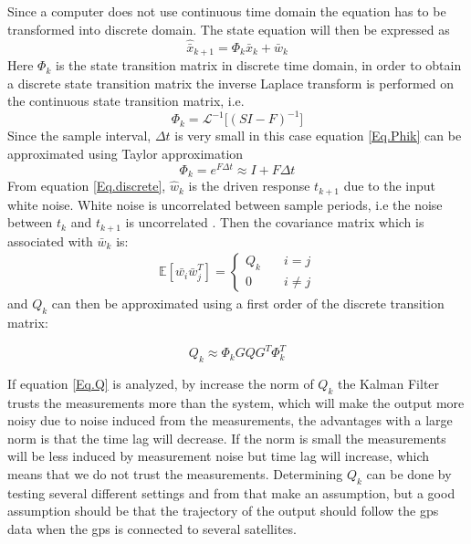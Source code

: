 Since a computer does not use continuous time domain the equation has to be transformed into discrete domain. The state equation will then be expressed as
\begin{equation}
\hat{\bar{x}}_{k+1} = \Phi_k \bar{x}_k +  \bar{w}_k	
\label{Eq.discrete}
\end{equation}
Here $\Phi_k$ is the state transition matrix in discrete time domain, in order to obtain a discrete state transition matrix the inverse Laplace transform is performed on the continuous state transition matrix, i.e.
\begin{equation}
\Phi_k = \mathcal{L}^{-1}\big[(SI-F)^{-1}\big]
\label{Eq.Phik}
\end{equation}
Since the sample interval, $\Delta t$ is very small in this case equation \eqref{Eq.Phik} can be approximated using Taylor approximation 
\begin{equation}
\Phi_k = e^{F\Delta t} \approx I + F \Delta t 
\label{Eq.Final_Phik}
\end{equation}
From equation \eqref{Eq.discrete}, $\hat{w}_k$ is the driven response $t_{k+1}$ due to the input white noise. White noise is uncorrelated between sample periods, i.e the noise between $t_k$ and $t_{k+1}$ is uncorrelated \cite{signal_process}. Then the covariance matrix which is associated with $\bar{w}_k$ is\cite{signal_process}:
\begin{align}
\mathbb{E}[\bar{w_i}\bar{w}_j^T] =
\begin{cases}
  Q_k &\quad i=j\\    
  0 &\quad i\neq j   
\end{cases}
\end{align}
and $Q_k$ can then be approximated using a first order of the discrete transition matrix\cite{Discrete_kalman}:

\begin{equation}
Q_k\approx \Phi_k GQG^T \Phi_k^T
\label{Eq.Q_k}
\end{equation}

If equation \eqref{Eq.Q} is analyzed, by increase the norm of $Q_k$ the Kalman Filter trusts the measurements more than the system, which will make the output more noisy due to noise induced from the measurements, the advantages with a large norm is that the time lag will decrease. If the norm is small the measurements will be less induced by measurement noise but time lag will increase, which means that we do not trust the measurements. Determining $Q_k$ can be done by testing several different settings and from that make an assumption, but a good assumption should be that the trajectory of the output should follow the \gls{gps} data when the \gls{gps} is connected to several satellites.

